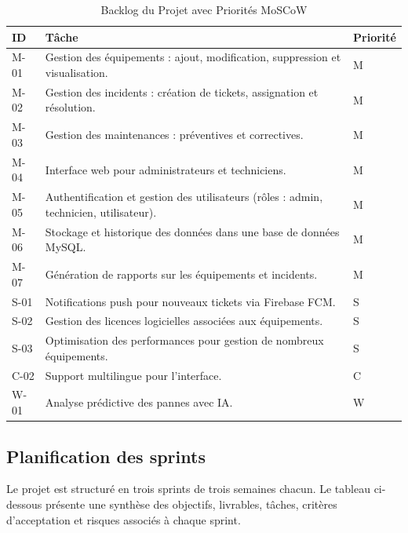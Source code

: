 \begin{table}[H]
\centering
\caption{Backlog du Projet avec Priorités MoSCoW}
\label{tab:backlog}
\begin{tabular}{|p{1.5cm}|p{8cm}|p{1.5cm}|}
\hline
\textbf{ID} & \textbf{Tâche} & \textbf{Priorité} \\
\hline
M-01 & Gestion des équipements : ajout, modification, suppression et visualisation. & M \\
\hline
M-02 & Gestion des incidents : création de tickets, assignation et résolution. & M \\
\hline
M-03 & Gestion des maintenances : préventives et correctives. & M \\
\hline
M-04 & Interface web pour administrateurs et techniciens. & M \\
\hline
M-05 & Authentification et gestion des utilisateurs (rôles : admin, technicien, utilisateur). & M \\
\hline
M-06 & Stockage et historique des données dans une base de données MySQL. & M \\
\hline
M-07 & Génération de rapports sur les équipements et incidents. & M \\
\hline
S-01 & Notifications push pour nouveaux tickets via Firebase FCM. & S \\
\hline
S-02 & Gestion des licences logicielles associées aux équipements. & S \\
\hline
S-03 & Optimisation des performances pour gestion de nombreux équipements. & S \\
\hline
C-02 & Support multilingue pour l'interface. & C \\
\hline
W-01 & Analyse prédictive des pannes avec IA. & W \\
\hline
\end{tabular}
\end{table}

\subsection{Planification des sprints}
\label{subsec:planification_sprints}

Le projet est structuré en trois sprints de trois semaines chacun. Le tableau ci-dessous présente une synthèse des objectifs, livrables, tâches, critères d’acceptation et risques associés à chaque sprint.

